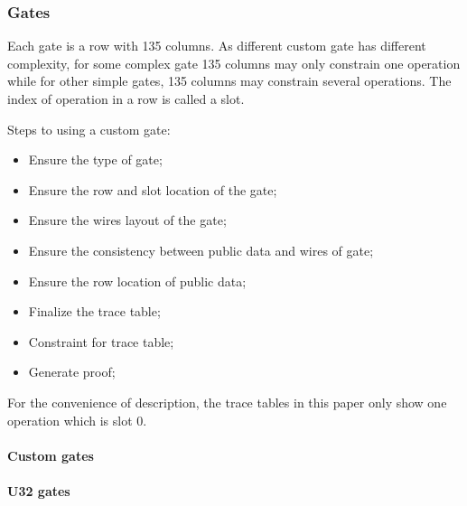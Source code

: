 \subsubsection{Gates} \label{sec:gates}

Each gate is a row with 135 columns. As different custom gate has different complexity, for some complex gate 135 columns may only constrain one
operation while for other simple gates, 135 columns may constrain several operations. The index of operation in a row is called a slot.

Steps to using a custom gate:
\begin{itemize}
    \item Ensure the type of gate;
    \item Ensure the row and slot location of the gate;
    \item Ensure the wires layout of the gate;
    \item Ensure the consistency between public data and wires of gate;
    \item Ensure the row location of public data;\
    \item Finalize the trace table;
    \item Constraint for trace table;
    \item Generate proof;
\end{itemize}

For the convenience of description, the trace tables in this paper only show one operation which is slot 0.

\paragraph{Custom gates}










\paragraph{U32 gates}




